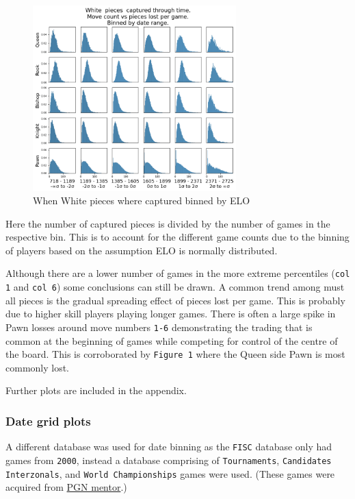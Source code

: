 \documentclass[11pt]{article}
\begin{document}
\begin{figure}[htbp]
\centering
\includegraphics[width=0.7\textwidth]{Images/_HIST_Queen_Rook_Bishop_Knight_Pawn_WHITE_ELO_FISC.png}
\caption{When White pieces where captured binned by ELO}
\end{figure}

Here the number of captured pieces is divided by the number of games in the respective bin. This is to account for the different game counts due to the binning of players based on the assumption ELO is normally distributed.

Although there are a lower number of games in the more extreme percentiles (\texttt{col 1} and \texttt{col 6}) some conclusions can still be drawn.
A common trend among must all pieces is the gradual spreading effect of pieces lost per game. This is probably due to higher skill players playing longer games.
There is often a large spike in Pawn losses around move numbers \texttt{1-6} demonstrating the trading that is common at the beginning of games while competing for control of the centre of the board. This is corroborated by \texttt{Figure 1} where the Queen side Pawn is most commonly lost.

Further plots are included in the appendix.
\subsubsection{Date grid plots}
\label{sec:orgd9d82d5}
A different database was used for date binning as the \texttt{FISC} database only had games from \texttt{2000}, instead a database comprising of \texttt{Tournaments}, \texttt{Candidates} \texttt{Interzonals}, and \texttt{World Championships} games were used. (These games were acquired from \href{https://www.pgnmentor.com/files.html\#events}{PGN mentor}.)
\end{document}
